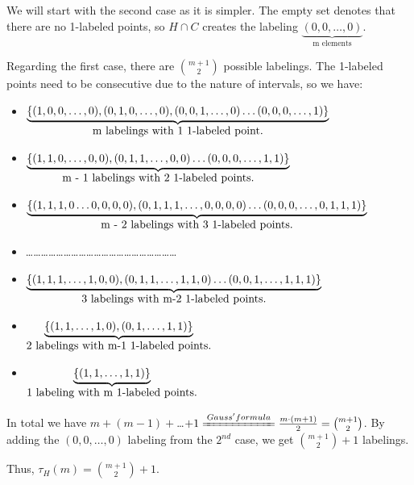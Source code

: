 \documentclass{article}
\newcommand{\<}{\langle}
\renewcommand{\>}{\rangle}
\theoremstyle{definition}
\begin{document}
We will start with the second case as it is simpler. The empty set denotes that there are no 1-labeled points, so $H \cap C$ creates the labeling $\underbrace{(0, 0, \dots , 0)}_\text{m elements}$.

Regarding the first case, there are ${m+1 \choose 2}$ possible labelings. The 1-labeled points need to be consecutive due to the nature of intervals, so we have:

\begin{itemize}
    \centering
    \item[] $\underbrace{\{(1, 0, 0, \dots , 0), (0, 1, 0, \dots, 0), (0, 0, 1, \dots, 0) \dots (0, 0, 0, \dots , 1)\}}_\text{\normalsize m labelings with 1 1-labeled point.}$
    
    \item[] 
    $\underbrace{\{(1, 1, 0, \dots  ,0, 0), (0, 1, 1, \dots, 0, 0) \dots (0, 0, 0, \dots , 1, 1)\}}_\text{\normalsize m - 1 labelings with 2 1-labeled points.}$
    
    \item[] 
    $\underbrace{\{(1, 1, 1, 0 \dots  0, 0, 0, 0), (0, 1, 1, 1, \dots, 0, 0, 0, 0) \dots (0, 0, 0, \dots ,0, 1, 1, 1)\}}_\text{\normalsize m - 2 labelings with 3 1-labeled points.}$

    \item[] \dots\dots\dots\dots\dots\dots\dots\dots\dots\dots\dots\dots\dots\dots\dots\dots\dots\dots\dots\dots
    
    \item[] 
    $\underbrace{\{(1, 1, 1, \dots  , 1, 0, 0), (0, 1, 1, \dots, 1, 1, 0) \dots (0, 0, 1, \dots , 1, 1, 1)\}}_\text{\normalsize 3 labelings with m-2 1-labeled points.}$
    
    \item[]
    $\underbrace{\{(1, 1, \dots  , 1, 0), (0, 1, \dots, 1, 1)\}}_\text{\normalsize 2 labelings with m-1 1-labeled points.}$
    
    \item[]
    $\underbrace{\{(1, 1, \dots  , 1, 1)\}}_\text{\normalsize 1 labeling with m 1-labeled points.}$
    
\end{itemize}

In total we have $m + (m-1) + $\dots$ + 1 \xlongequal{Gauss' formula} \frac{m\cdot(m+1)}{2} = {m+1 \choose 2}$. By adding the $(0, 0, \dots, 0)$ labeling from the $2^{nd}$ case, we get ${m+1 \choose 2} + 1$ labelings.

Thus, $\tau_H(m) = {m+1 \choose 2} + 1$.
\end{document}

